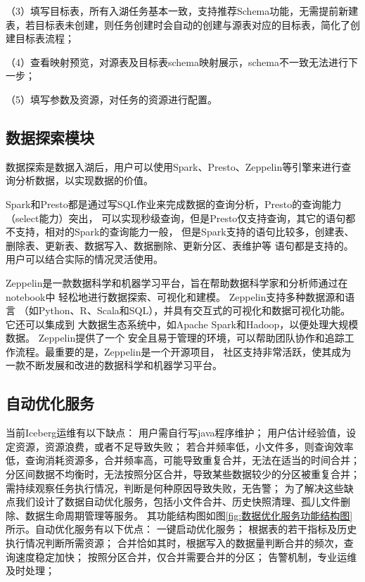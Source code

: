 （3）填写目标表，所有入湖任务基本一致，支持推荐Schema功能，无需提前新建表，若目标表未创建，则任务创建时会自动的创建与源表对应的目标表，简化了创建目标表流程；

（4）查看映射预览，对源表及目标表schema映射展示，schema不一致无法进行下一步；

（5）填写参数及资源，对任务的资源进行配置。

\subsection{数据探索模块}

数据探索是数据入湖后，用户可以使用Spark、Presto、Zeppelin等引擎来进行查询分析数据，以实现数据的价值。

Spark和Presto都是通过写SQL作业来完成数据的查询分析，Presto的查询能力（select能力）突出，
可以实现秒级查询，但是Presto仅支持查询，其它的语句都不支持，相对的Spark的查询能力一般，
但是Spark支持的语句比较多，创建表、删除表、更新表、数据写入、数据删除、更新分区、表维护等
语句都是支持的。用户可以结合实际的情况灵活使用。

Zeppelin是一款数据科学和机器学习平台，旨在帮助数据科学家和分析师通过在notebook中
轻松地进行数据探索、可视化和建模。 Zeppelin支持多种数据源和语言
（如Python、R、Scala和SQL），并具有交互式的可视化和数据可视化功能。它还可以集成到
大数据生态系统中，如Apache Spark和Hadoop，以便处理大规模数据。 Zeppelin提供了一个
安全且易于管理的环境，可以帮助团队协作和追踪工作流程。最重要的是，Zeppelin是一个开源项目，
社区支持非常活跃，使其成为一款不断发展和改进的数据科学和机器学习平台\cite{34}。

\subsection{自动优化服务}

当前Iceberg运维有以下缺点：
用户需自行写java程序维护；
用户估计经验值，设定资源，资源浪费，或者不足导致失败；
若合并频率低，小文件多，则查询效率低，查询消耗资源多，合并频率高，可能导致重复合并，无法在适当的时间合并；
分区间数据不均衡时，无法按照分区合并，导致某些数据较少的分区被重复合并；
需持续观察任务执行情况，判断是何种原因导致失败，无告警；
为了解决这些缺点我们设计了数据自动优化服务，包括小文件合并、历史快照清理、孤儿文件删除、数据生命周期管理等服务。
其功能结构图如图\ref{fig:数据优化服务功能结构图}所示。自动优化服务有以下优点：
一键启动优化服务；
根据表的若干指标及历史执行情况判断所需资源；
合并恰如其时，根据写入的数据量判断合并的频次，查询速度稳定加快；
按照分区合并，仅合并需要合并的分区；
告警机制，专业运维及时处理；


